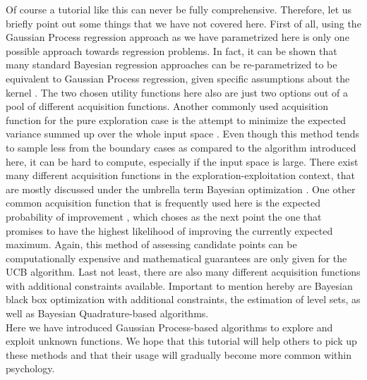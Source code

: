 \documentclass[authoryear,11pt,review]{elsarticle}
\begin{document}
Of course a tutorial like this can never be fully comprehensive. Therefore, let us briefly point out some things that we have not covered here. First of all, using the Gaussian Process regression approach as we have parametrized here is only one possible approach towards regression problems. In fact, it can be shown that many standard Bayesian regression approaches can be re-parametrized to be equivalent to Gaussian Process regression, given specific assumptions about the kernel \citep{duvenaud2013structure}. The two chosen utility functions here also are just two options out of a pool of different acquisition functions. Another commonly used acquisition function for the pure exploration case is the attempt to minimize the expected variance summed up over the whole input space \citep{gramacy2014local}. Even though this method tends to sample less from the boundary cases as compared to the algorithm introduced here, it can be hard to compute, especially if the input space is large. There exist many different acquisition functions in the exploration-exploitation context, that are mostly discussed under the umbrella term Bayesian optimization \citep{de2012regret}. One other common acquisition function that is frequently used here is the expected probability of improvement \citep{mockus2012bayesian}, which choses as the next point the one that promises to have the highest likelihood of improving the currently expected maximum.  Again, this method of assessing candidate points can be computationally expensive and mathematical guarantees are only given for the UCB algorithm. Last not least, there are also many different acquisition functions with additional constraints available. Important to mention hereby are Bayesian black box optimization with additional constraints, the estimation of level sets, as well as Bayesian Quadrature-based algorithms. \\

Here we have introduced Gaussian Process-based algorithms to explore and exploit unknown functions. We hope that this tutorial will help others to pick up these methods and that their usage will gradually become more common within psychology.

\end{document}

